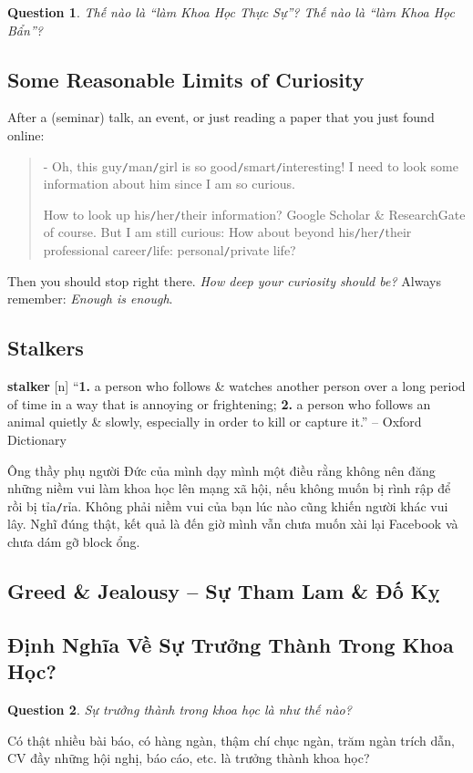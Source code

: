 \documentclass{article}
\numberwithin{equation}{section}
\newtheorem{question}{Question}[section]
\begin{document}
\begin{question}
	Thế nào là ``làm Khoa Học Thực Sự''? Thế nào là ``làm Khoa Học Bẩn''?
\end{question}

\subsection{Some Reasonable Limits of Curiosity}
After a (seminar) talk, an event, or just reading a paper that you just found online:
\begin{quotation}
	- Oh, this guy\texttt{/}man\texttt{/}girl is so good\texttt{/}smart\texttt{/}interesting! I need to look some information about him since I am so curious.
	
	How to look up his\texttt{/}her\texttt{/}their information? Google Scholar \& ResearchGate of course. But I am still curious: How about beyond his\texttt{/}her\texttt{/}their professional career\texttt{/}life: personal\texttt{/}private life?
\end{quotation}
Then you should stop right there. \textit{How deep your curiosity should be?} Always remember: \textit{Enough is enough}.

\subsection{Stalkers}
\textbf{stalker} [n] ``\textbf{1.} a person who follows \& watches another person over a long period of time in a way that is annoying or frightening; \textbf{2.} a person who follows an animal quietly \& slowly, especially in order to kill or capture it.'' -- Oxford Dictionary



Ông thầy phụ người Đức của mình dạy mình một điều rằng không nên đăng những niềm vui làm khoa học lên mạng xã hội, nếu không muốn bị rình rập để rồi bị tỉa\texttt{/}rỉa. Không phải niềm vui của bạn lúc nào cũng khiến người khác vui lây. Nghĩ đúng thật, kết quả là đến giờ mình vẫn chưa muốn xài lại Facebook và chưa dám gỡ block ổng.

\subsection{Greed \& Jealousy -- Sự Tham Lam \& Đố Kỵ}

\subsection{Định Nghĩa Về Sự Trưởng Thành Trong Khoa Học?}
\begin{question}
	Sự trưởng thành trong khoa học là như thế nào?
\end{question}
Có thật nhiều bài báo, có hàng ngàn, thậm chí chục ngàn, trăm ngàn trích dẫn, CV đầy những hội nghị, báo cáo, etc. là trưởng thành khoa học?
\end{document}
